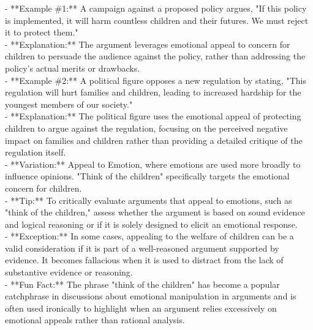 \documentclass[a4paper,12pt,single,pdftex]{scrbook}
\begin{document}
    
      - **Example \#1:** A campaign against a proposed policy argues, "If this policy is implemented, it will harm countless children and their futures. We must reject it to protect them."
    \\

    
      - **Explanation:** The argument leverages emotional appeal to concern for children to persuade the audience against the policy, rather than addressing the policy’s actual merits or drawbacks.
    \\

    
      - **Example \#2:** A political figure opposes a new regulation by stating, "This regulation will hurt families and children, leading to increased hardship for the youngest members of our society."
    \\

    
      - **Explanation:** The political figure uses the emotional appeal of protecting children to argue against the regulation, focusing on the perceived negative impact on families and children rather than providing a detailed critique of the regulation itself.
    \\

    
      - **Variation:** Appeal to Emotion, where emotions are used more broadly to influence opinions. "Think of the children" specifically targets the emotional concern for children.
    \\

    
      - **Tip:** To critically evaluate arguments that appeal to emotions, such as "think of the children," assess whether the argument is based on sound evidence and logical reasoning or if it is solely designed to elicit an emotional response.
    \\

    
      - **Exception:** In some cases, appealing to the welfare of children can be a valid consideration if it is part of a well-reasoned argument supported by evidence. It becomes fallacious when it is used to distract from the lack of substantive evidence or reasoning.
    \\

    
      - **Fun Fact:** The phrase "think of the children" has become a popular catchphrase in discussions about emotional manipulation in arguments and is often used ironically to highlight when an argument relies excessively on emotional appeals rather than rational analysis.
    \\

  
\end{document}
